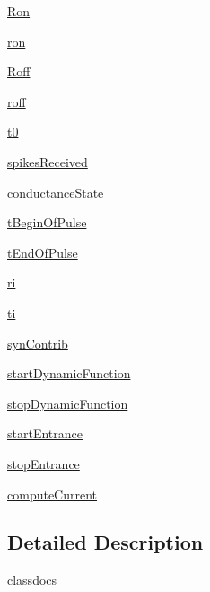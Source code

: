 \begin{DoxyCompactItemize}
\item 
\hyperlink{class_synapse_1_1_synapse_ae759c51a7196995510fe3eb086050c76}{Ron}
\item 
\hyperlink{class_synapse_1_1_synapse_a2e4a3427e071a311ac52341ad67f90c6}{ron}
\item 
\hyperlink{class_synapse_1_1_synapse_ae67ffbbd23cd9c56f20bda9e8e040663}{Roff}
\item 
\hyperlink{class_synapse_1_1_synapse_a9a8d45c76378fae50d7ed2af29602aa8}{roff}
\item 
\hyperlink{class_synapse_1_1_synapse_ad0adf1cb832bd7ce7918f2779171d7d7}{t0}
\item 
\hyperlink{class_synapse_1_1_synapse_a58ea1b63c2053745598fa27dfc72cf9f}{spikes\-Received}
\item 
\hyperlink{class_synapse_1_1_synapse_a89d3762daa9c60be63403a5ce9fd9a84}{conductance\-State}
\item 
\hyperlink{class_synapse_1_1_synapse_acdc426c52a2a13183d5f8c54a830bfa2}{t\-Begin\-Of\-Pulse}
\item 
\hyperlink{class_synapse_1_1_synapse_adfd02fa815d45efd0cb1bc0124fe2c90}{t\-End\-Of\-Pulse}
\item 
\hyperlink{class_synapse_1_1_synapse_adc85234a081ad18bf19473be530dcf78}{ri}
\item 
\hyperlink{class_synapse_1_1_synapse_a714c95723607acad52af96ad55b6c575}{ti}
\item 
\hyperlink{class_synapse_1_1_synapse_ac9fc1da99a88f8dd286d3ff3ce484b85}{syn\-Contrib}
\item 
\hyperlink{class_synapse_1_1_synapse_ac76e1ee32dfde6ec33fcc52e8cdd0ef7}{start\-Dynamic\-Function}
\item 
\hyperlink{class_synapse_1_1_synapse_afeef9c1a33ee0b333c5df72478d91745}{stop\-Dynamic\-Function}
\item 
\hyperlink{class_synapse_1_1_synapse_a857ba1cf500bbc602d94655683f62609}{start\-Entrance}
\item 
\hyperlink{class_synapse_1_1_synapse_aac4c50cca15e42396f1bfff761693696}{stop\-Entrance}
\item 
\hyperlink{class_synapse_1_1_synapse_a9f68cb297a4bc98c4cb9d5c042b5d0d6}{compute\-Current}
\end{DoxyCompactItemize}


\subsection{Detailed Description}
classdocs 

